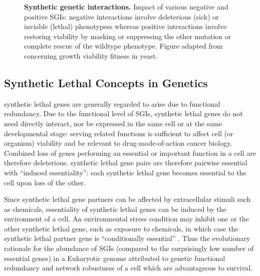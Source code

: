 \begin{figure}[!ht]
\begin{mdframed}
   \caption[Synthetic genetic interactions]{\small \textbf{Synthetic genetic interactions.} Impact of various negative and positive \glspl{SGI}: negative interactions involve deleterious (sick) or inviable (lethal) phenotypess whereas positive interactions involve restoring viability by masking or suppressing the other mutation or complete rescue of the wildtype phenotype. Figure adapted from \citep{Costanzo2011} concerning growth viability fitness in yeast.}
\label{fig:Costanzo2011}
\end{mdframed}
\end{figure}

\subsection{Synthetic Lethal Concepts in Genetics}

\Gls{synthetic lethal} genes are generally regarded to arise due to functional redundancy. Due to the functional level of \glspl{SGI}, \gls{synthetic lethal} genes do not need directly interact, nor be expressed in the same cell or at the same developmental stage: serving related functions is sufficient to affect cell (or organism) viability and be relevant to drug-mode-of-action cancer biology. Combined loss of genes performing an essential or important function in a cell are therefore deleterious. \Gls{synthetic lethal} gene pairs are therefore pairwise essential with ``induced essentiality'': each \gls{synthetic lethal} gene becomes essential to the cell upon loss of the other.

Since \gls{synthetic lethal} gene partners can be affected by extracellular stimuli such as chemicals, essentiality of \gls{synthetic lethal} genes can be induced by the environment of a cell.  An environmental stress condition may inhibit one or the other \gls{synthetic lethal} gene, such as exposure to chemicals, in which case the \gls{synthetic lethal} partner gene is ``conditionally essential'' \citep{Hillenmeyer2008}. Thus the evolutionary rationale for the abundance of \glspl{SGI} (compared to the surprisingly low number of essential genes) in a Eukaryotic genome attributed to genetic functional redundancy and network robustness of a cell which are advantageous to survival. 

